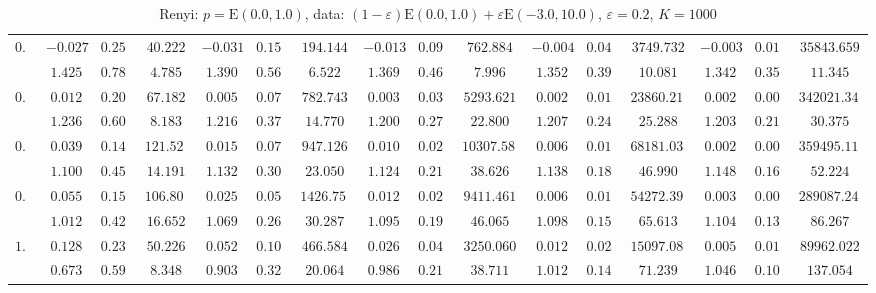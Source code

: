 \begin{table}
\begin{center}
\begin{tabular}{|c|ccc|ccc|ccc|ccc|ccc|}
\hline 
$0.2$ & $ -0.027 $ & $ 0.258 $ & $ 40.222 $ & $ -0.031 $ & $ 0.158 $ & $ 194.144 $ & $ -0.013 $ & $ 0.091 $ & $ 762.884 $ & $ -0.004 $ & $ 0.045 $ & $ 3749.732 $ & $ -0.003 $ & $ 0.015 $ & $ 35843.659 $\\ 
 & $ 1.425 $ & $ 0.789 $ & $ 4.785 $ & $ 1.390 $ & $ 0.567 $ & $ 6.522 $ & $ 1.369 $ & $ 0.464 $ & $ 7.996 $ & $ 1.352 $ & $ 0.392 $ & $ 10.081 $ & $ 1.342 $ & $ 0.359 $ & $ 11.345 $\\ 
\hline 
$0.3$ & $ 0.012 $ & $ 0.200 $ & $ 67.182 $ & $ 0.005 $ & $ 0.079 $ & $ 782.743 $ & $ 0.003 $ & $ 0.034 $ & $ 5293.621 $ & $ 0.002 $ & $ 0.018 $ & $ 23860.212 $ & $ 0.002 $ & $ 0.005 $ & $ 342021.340 $\\ 
 & $ 1.236 $ & $ 0.603 $ & $ 8.183 $ & $ 1.216 $ & $ 0.377 $ & $ 14.770 $ & $ 1.200 $ & $ 0.275 $ & $ 22.800 $ & $ 1.207 $ & $ 0.248 $ & $ 25.288 $ & $ 1.203 $ & $ 0.219 $ & $ 30.375 $\\ 
\hline 
$0.4$ & $ 0.039 $ & $ 0.149 $ & $ 121.524 $ & $ 0.015 $ & $ 0.071 $ & $ 947.126 $ & $ 0.010 $ & $ 0.025 $ & $ 10307.582 $ & $ 0.006 $ & $ 0.010 $ & $ 68181.030 $ & $ 0.002 $ & $ 0.005 $ & $ 359495.115 $\\ 
 & $ 1.100 $ & $ 0.458 $ & $ 14.191 $ & $ 1.132 $ & $ 0.302 $ & $ 23.050 $ & $ 1.124 $ & $ 0.211 $ & $ 38.626 $ & $ 1.138 $ & $ 0.182 $ & $ 46.990 $ & $ 1.148 $ & $ 0.167 $ & $ 52.224 $\\ 
\hline 
$0.5$ & $ 0.055 $ & $ 0.158 $ & $ 106.801 $ & $ 0.025 $ & $ 0.058 $ & $ 1426.758 $ & $ 0.012 $ & $ 0.026 $ & $ 9411.461 $ & $ 0.006 $ & $ 0.012 $ & $ 54272.394 $ & $ 0.003 $ & $ 0.005 $ & $ 289087.240 $\\ 
 & $ 1.012 $ & $ 0.423 $ & $ 16.652 $ & $ 1.069 $ & $ 0.263 $ & $ 30.287 $ & $ 1.095 $ & $ 0.193 $ & $ 46.065 $ & $ 1.098 $ & $ 0.154 $ & $ 65.613 $ & $ 1.104 $ & $ 0.130 $ & $ 86.267 $\\ 
\hline 
$1.0$ & $ 0.128 $ & $ 0.231 $ & $ 50.226 $ & $ 0.052 $ & $ 0.102 $ & $ 466.584 $ & $ 0.026 $ & $ 0.044 $ & $ 3250.060 $ & $ 0.012 $ & $ 0.022 $ & $ 15097.081 $ & $ 0.005 $ & $ 0.010 $ & $ 89962.022 $\\ 
 & $ 0.673 $ & $ 0.597 $ & $ 8.348 $ & $ 0.903 $ & $ 0.323 $ & $ 20.064 $ & $ 0.986 $ & $ 0.211 $ & $ 38.711 $ & $ 1.012 $ & $ 0.148 $ & $ 71.239 $ & $ 1.046 $ & $ 0.103 $ & $ 137.054 $\\ 
\hline 
\end{tabular}
\caption{Renyi: $p = \mathrm{E}(0.0,1.0)$, data: $(1-\varepsilon)\mathrm{E}(0.0,1.0) + \varepsilon \mathrm{E}(-3.0,10.0)$, $\varepsilon =  0.2$, $K = 1000$} 
\end{center}
\end{table}